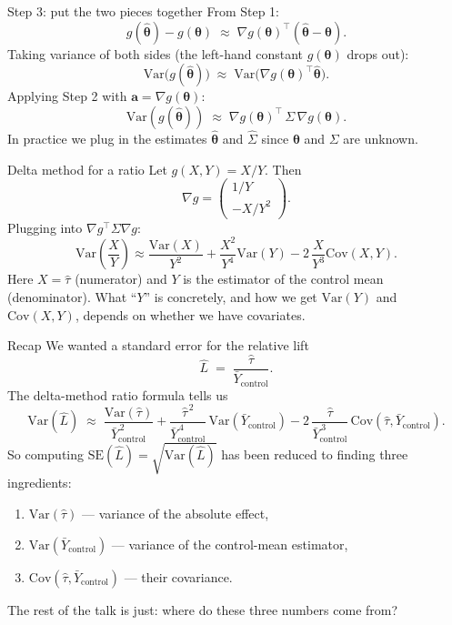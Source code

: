 \documentclass[10pt]{beamer}
\begin{document}
\begin{frame}{Step 3: put the two pieces together}
From Step 1:
\[
g(\hat{\bm\theta}) - g(\bm\theta) \;\approx\; \nabla g(\bm\theta)^\top (\hat{\bm\theta} - \bm\theta).
\]
Taking variance of both sides (the left-hand constant $g(\bm\theta)$ drops out):
\[
\mathrm{Var}\!\big(g(\hat{\bm\theta})\big)
\;\approx\; \mathrm{Var}\!\big(\nabla g(\bm\theta)^\top \hat{\bm\theta}\big).
\]
Applying Step 2 with $\mathbf{a} = \nabla g(\bm\theta)$:
\[
\boxed{\;\mathrm{Var}\!\left(g(\hat{\bm\theta})\right) \;\approx\; \nabla g(\bm\theta)^\top \,\Sigma\, \nabla g(\bm\theta).\;}
\]
In practice we plug in the estimates $\hat{\bm\theta}$ and $\hat\Sigma$ since $\bm\theta$ and $\Sigma$ are unknown.
\end{frame}

\begin{frame}{Delta method for a ratio}
Let $g(X, Y) = X / Y$. Then
\[
\nabla g = \begin{pmatrix} 1/Y \\ -X/Y^2 \end{pmatrix}.
\]
Plugging into $\nabla g^\top \Sigma \nabla g$:
\[
\mathrm{Var}\!\left(\frac{X}{Y}\right) \approx
\frac{\mathrm{Var}(X)}{Y^2}
+ \frac{X^2}{Y^4}\mathrm{Var}(Y)
- 2\,\frac{X}{Y^3}\mathrm{Cov}(X, Y).
\]
Here $X = \hat\tau$ (numerator) and $Y$ is the estimator of the control mean (denominator). What ``$Y$'' is concretely, and how we get $\mathrm{Var}(Y)$ and $\mathrm{Cov}(X, Y)$, depends on whether we have covariates.
\end{frame}

\begin{frame}{Recap}
We wanted a standard error for the relative lift
\[
\hat L \;=\; \frac{\hat\tau}{\bar Y_{\text{control}}}.
\]
The delta-method ratio formula tells us
\[
\mathrm{Var}(\hat L) \;\approx\;
\frac{\mathrm{Var}(\hat\tau)}{\bar Y_{\text{control}}^{\,2}}
+ \frac{\hat\tau^{\,2}}{\bar Y_{\text{control}}^{\,4}}\,\mathrm{Var}(\bar Y_{\text{control}})
- 2\,\frac{\hat\tau}{\bar Y_{\text{control}}^{\,3}}\,\mathrm{Cov}(\hat\tau,\bar Y_{\text{control}}).
\]
So computing $\mathrm{SE}(\hat L) = \sqrt{\mathrm{Var}(\hat L)}$ has been reduced to finding \alert{three} ingredients:
\begin{enumerate}
  \item $\mathrm{Var}(\hat\tau)$ \hfill --- variance of the absolute effect,
  \item $\mathrm{Var}(\bar Y_{\text{control}})$ \hfill --- variance of the control-mean estimator,
  \item $\mathrm{Cov}(\hat\tau, \bar Y_{\text{control}})$ \hfill --- their covariance.
\end{enumerate}
The rest of the talk is just: \alert{where do these three numbers come from?}
\end{frame}
\end{document}
